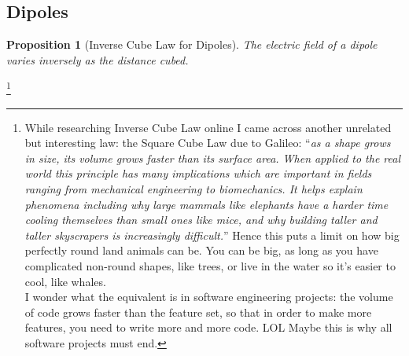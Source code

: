\documentclass[12pt]{article}
\theoremstyle{plain}
\newtheorem{proposition}[theorem]{Proposition}
\theoremstyle{definition}
\theoremstyle{remark}
\begin{document}
\subsection{Dipoles}

\begin{mdframed}
\begin{proposition}[Inverse Cube Law for Dipoles]
The electric field of a dipole varies inversely as the distance cubed.
\end{proposition}
\end{mdframed}
\footnote{While researching Inverse Cube Law online I came across another unrelated but interesting law: the Square Cube Law due to Galileo: ``\textit{as a shape grows in size, its volume grows faster than its surface area. When applied to the real world this principle has many implications which are important in fields ranging from mechanical engineering to biomechanics. It helps explain phenomena including why large mammals like elephants have a harder time cooling themselves than small ones like mice, and why building taller and taller skyscrapers is increasingly difficult.}'' Hence this puts a limit on how big perfectly round land animals can be. You can be big, as long as you have complicated non-round shapes, like trees, or live in the water so it's easier to cool, like whales.\\ \indent I wonder what the equivalent is in software engineering projects: the volume of code grows faster than the feature set, so that in order to make more features, you need to write more and more code. LOL Maybe this is why all software projects must end.}
\end{document}
